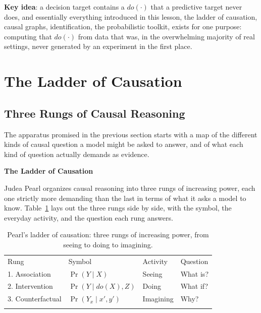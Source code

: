 \textbf{Key idea}: a decision target contains a $do(\cdot)$ that a predictive target never does, and essentially everything introduced in this lesson, the ladder of causation, causal graphs, identification, the probabilistic toolkit, exists for one purpose: computing that $do(\cdot)$ from data that was, in the overwhelming majority of real settings, never generated by an experiment in the first place.

\section{The Ladder of Causation}
\label{chap:the-ladder-of-causation}

\subsection{Three Rungs of Causal Reasoning}
\label{sec:three-rungs-of-causal-reasoning}

The apparatus promised in the previous section starts with a map of the different kinds of causal question a model might be asked to answer, and of what each kind of question actually demands as evidence.

\textbf{The Ladder of Causation}

Judea Pearl organizes causal reasoning into three rungs of increasing power, each one strictly more demanding than the last in terms of what it asks a model to know. Table~\ref{tab:ladder-of-causation} lays out the three rungs side by side, with the symbol, the everyday activity, and the question each rung answers.

\begin{table}[!t]
\caption{Pearl's ladder of causation: three rungs of increasing power, from seeing to doing to imagining.}
\label{tab:ladder-of-causation}
\begin{tabular}{p{2.3cm}p{3.4cm}p{2.0cm}p{2.6cm}}
\hline\noalign{\smallskip}
Rung & Symbol & Activity & Question \\
\noalign{\smallskip}\svhline\noalign{\smallskip}
1. Association & $\Pr(Y \mid X)$ & Seeing & What is? \\
2. Intervention & $\Pr(Y \mid do(X), Z)$ & Doing & What if? \\
3. Counterfactual & $\Pr(Y_x \mid x', y')$ & Imagining & Why? \\
\noalign{\smallskip}\hline\noalign{\smallskip}
\end{tabular}
\end{table}

